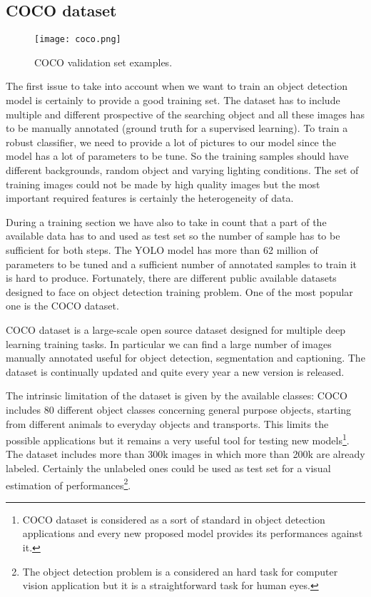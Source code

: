 \documentclass{standalone}
\begin{document}
\subsection[COCO]{COCO dataset}\label{obj_detection:coco}

\begin{center}
\begin{figure}[htbp]
\centering
\texttt{[image: coco.png]}
\caption{COCO validation set examples.
}
\label{fig:coco}
\end{figure}
\end{center}

The first issue to take into account when we want to train an object detection model is certainly to provide a good training set.
The dataset has to include multiple and different prospective of the searching object and all these images has to be manually annotated (ground truth for a supervised learning).
To train a robust classifier, we need to provide a lot of pictures to our model since the model has a lot of parameters to be tune.
So the training samples should have different backgrounds, random object and varying lighting conditions.
The set of training images could not be made by high quality images but the most important required features is certainly the heterogeneity of data.

During a training section we have also to take in count that a part of the available data has to  and used as test set so the number of sample has to be sufficient for both steps.
The YOLO model has more than 62 million of parameters to be tuned and a sufficient number of annotated samples to train it is hard to produce.
Fortunately, there are different public available datasets designed to face on object detection training problem.
One of the most popular one is the COCO dataset.

COCO dataset is a large-scale open source dataset designed for multiple deep learning training tasks.
In particular we can find a large number of images manually annotated useful for object detection, segmentation and captioning.
The dataset is continually updated and quite every year a new version is released.

The intrinsic limitation of the dataset is given by the available classes: COCO includes 80 different object classes concerning general purpose objects, starting from different animals to everyday objects and transports.
This limits the possible applications but it remains a very useful tool for testing new models\footnote{
  COCO dataset is considered as a sort of standard in object detection applications and every new proposed model provides its performances against it.
}.
The dataset includes more than 300k images in which more than 200k are already labeled.
Certainly the unlabeled ones could be used as test set for a visual estimation of performances\footnote{
  The object detection problem is a considered an hard task for computer vision application but it is a straightforward task for human eyes.
}.
\end{document}
